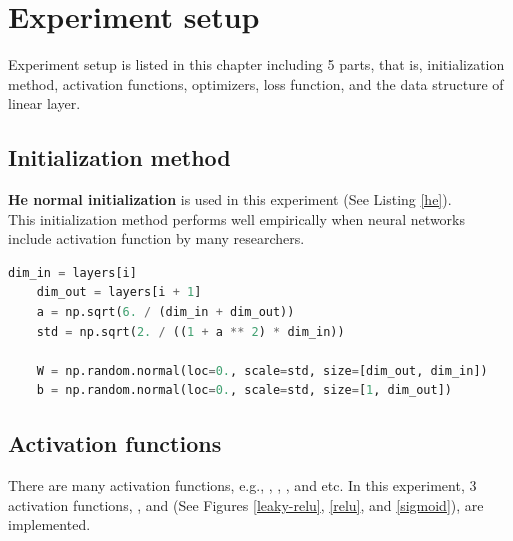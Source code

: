 \chapter{Experiment setup}
\indent
    Experiment setup is listed in this chapter including 5 parts, 
    that is, initialization method, activation functions, optimizers, loss function, and the data structure of linear layer.

\section{Initialization method}
\indent
    \textbf{He normal initialization} is used in this experiment (See Listing \ref{he}). \\
    This initialization method performs well empirically when neural networks include  activation function by many researchers.
    \begin{lstlisting}[language=Python, caption={He normal initialization code.}, label={he}]
    dim_in = layers[i]
    dim_out = layers[i + 1]
    a = np.sqrt(6. / (dim_in + dim_out))
    std = np.sqrt(2. / ((1 + a ** 2) * dim_in))
    
    W = np.random.normal(loc=0., scale=std, size=[dim_out, dim_in])
    b = np.random.normal(loc=0., scale=std, size=[1, dim_out])\end{lstlisting}

\section{Activation functions}
\indent
    There are many activation functions, e.g., , , , and etc. 
    In this experiment, 3 activation functions, ,  and  
    (See Figures \ref{leaky-relu}, \ref{relu}, and \ref{sigmoid}), are implemented.

